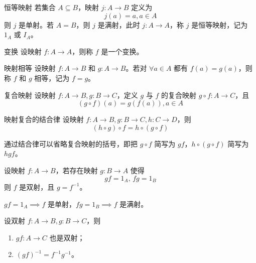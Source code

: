 \hfill

\begin{definition}{恒等映射}
  若集合 $A \subseteq B$，映射 $j:A \to B$ 定义为
  \[j(a) = a,a \in A\]
  则 $j$ 是单射。若 $A = B$，则 $j$ 是满射，此时 $j: A \to A$，称 $j$ 是恒等映射，记为 $1_A$ 或 $I_A$。
\end{definition}

\begin{definition}{变换}
  设映射 $f: A \to A$，则称 $f$ 是一个变换。
\end{definition}

\begin{definition}{映射相等}
  设映射 $f: A \to B$ 和 $g: A \to B$。若对 $\forall a \in A$ 都有 $f(a) = g(a)$，则称 $f$ 和 $g$ 相等，记为 $f = g$。
\end{definition}

\begin{definition}{复合映射}
  设映射 $f: A \to B, g: B \to C$，定义 $g$ 与 $f$ 的复合映射 $g \circ f : A \to C$，且
  \[(g \circ f)(a) = g(f(a)),a \in A\]
\end{definition}

\begin{proposition}{映射复合的结合律}
  设映射 $f: A \to B, g: B \to C, h: C \to D$，则
  \[(h \circ g)\circ f = h \circ(g \circ f)\]
\end{proposition}

通过结合律可以省略复合映射的括号，即把 $g \circ f$ 简写为 $gf$，$h \circ(g \circ f)$ 简写为 $hgf$。

\begin{proposition}
  设映射 $f: A \to B$，若存在映射 $g: B \to A$ 使得
  \[gf = 1_A,\, fg = 1_B\]
  则 $f$ 是双射，且 $g = f^{-1}$。
\end{proposition}

$gf = 1_A \implies f$ 是单射，$fg = 1_B \implies f$ 是满射。

\begin{proposition}
  设双射 $f: A \to B,g: B \to C$，则
  \begin{enumerate}
    \item $gf: A \to C$ 也是双射；
    \item $(gf)^{-1} = f^{-1}g^{-1}$。
  \end{enumerate}
\end{proposition}

